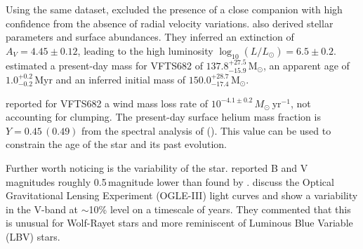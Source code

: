 \documentclass[apjl,twocolumn]{emulateapj}
\newcommand{\Msun}{{\,\mathrm{M}_\odot}}
\begin{document}
Using the same dataset,
\citet{bestenlehner:11} excluded the presence of a close companion
with high confidence from the absence of radial velocity variations.
\citet{bestenlehner:11} %
also derived stellar
parameters and surface abundances. They inferred an extinction
of $A_V=4.45\pm0.12$, leading to the high luminosity
$\log_{10}(L/L_\odot) =  6.5\pm0.2$. \citet{schneider:18} estimated
a present-day mass for VFTS682 of $137.8^{+27.5}_ {-15.9}\Msun$, an
apparent age of $1.0^{+0.2}_{-0.2}$\,Myr and an inferred initial mass
of $150.0^{+28.7}_{-17.4}\Msun$.%

\citet{bestenlehner:11} reported for VFTS682 a wind mass loss rate of
$10^{-4.1\pm0.2}\,M_\odot \ \mathrm{yr}^{-1}$, %
not accounting for
clumping. The present-day surface helium mass
fraction is $Y=0.45\, (0.49)$ from the spectral analysis of
\cite{bestenlehner:11} (\citealt{rubio-diez:17}). This value can be
used to constrain the age of the star and its past evolution.


Further worth noticing is the variability of the
star. \citet{parker:93} reported B and V magnitudes roughly 0.5\,magnitude
lower than found by \citet{evans:11}.
\citet{bestenlehner:11} discuss the Optical Gravitational Lensing
Experiment (OGLE-III) light curves \citep{udalski:08} and show a
variability in the V-band at $\sim$10\% level on a timescale of years.
They commented that this is unusual for Wolf-Rayet stars and more reminiscent
of Luminous Blue Variable (LBV) stars. %
\end{document}
